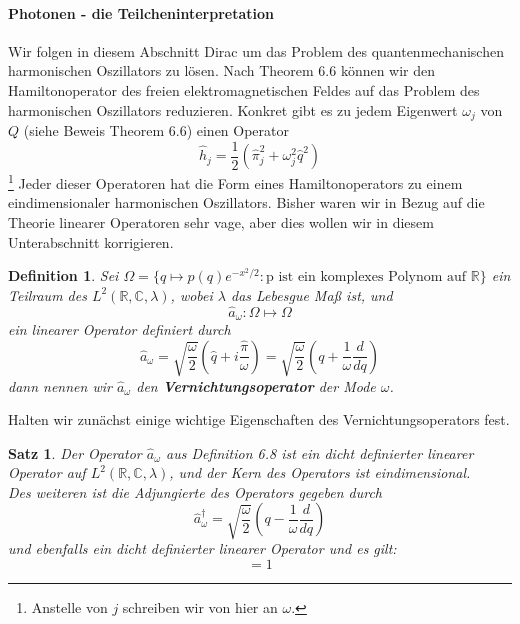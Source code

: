\documentclass[11pt,a4paper,leqno]{report}
\newtheorem{proposition}{Satz}[chapter]
\newtheorem{definition}[theorem]{Definition}
\numberwithin{equation}{chapter}
\begin{document}
\paragraph{Photonen - die Teilcheninterpretation}
Wir folgen in diesem Abschnitt Dirac um das Problem des quantenmechanischen harmonischen Oszillators zu l\"osen. Nach Theorem 6.6 k\"onnen wir den Hamiltonoperator des freien elektromagnetischen Feldes auf das Problem des harmonischen Oszillators reduzieren. Konkret gibt es zu jedem Eigenwert $\omega_j$ von $Q$ (siehe Beweis Theorem 6.6) einen Operator
\begin{equation*}
	\hat{h}_j = \frac{1}{2}(\hat{\pi}_j^2 + \omega_j^2 \hat{q}^2)
\end{equation*}\footnote{Anstelle von $j$ schreiben wir von hier an $\omega$.}
Jeder dieser Operatoren hat die Form eines Hamiltonoperators zu einem eindimensionaler harmonischen Oszillators. Bisher waren wir in Bezug auf die Theorie linearer Operatoren sehr vage, aber dies wollen wir in diesem Unterabschnitt korrigieren.
\begin{definition}
	Sei $\Omega=\{q\mapsto p(q)e^{-x^2 / 2}: \text{p ist ein komplexes Polynom auf $\mathbb{R}$}\}$ ein Teilraum des $L^2(\mathbb{R}, \mathbb{C},\lambda)$, wobei $\lambda$ das Lebesgue Ma\ss{} ist, und 
	\begin{equation}
		\hat{a}_\omega: \Omega \mapsto \Omega
	\end{equation}
ein linearer Operator definiert durch 
\begin{equation}
	\hat{a}_\omega = \sqrt{\frac{\omega}{2}}(\hat{q} + i \frac{\hat{\pi}}{\omega}) = \sqrt{\frac{\omega}{2}}(q +  \frac{1}{\omega}\frac{d}{dq})
\end{equation}
dann nennen wir $\hat{a}_\omega$ den \textbf{Vernichtungsoperator} der Mode $\omega$.
\end{definition}
\noindent
Halten wir zun\"achst einige wichtige Eigenschaften des 
Vernichtungsoperators fest.
\begin{proposition}
	Der Operator $\hat{a}_\omega$ aus Definition 6.8 ist ein dicht definierter linearer Operator auf $L^2(\mathbb{R}, \mathbb{C},\lambda)$, und der Kern des Operators ist eindimensional.\\
	Des weiteren ist die Adjungierte des Operators gegeben durch 
	\begin{equation}
		\hat{a}_\omega^\dagger = \sqrt{\frac{\omega}{2}}(q - \frac{1}{\omega}\frac{d}{dq})
	\end{equation}
	und ebenfalls ein dicht definierter linearer Operator und es gilt:
	\begin{equation}
		[\hat{a}_\omega, \hat{a}_\omega^\dagger] = 1
	\end{equation}
\end{proposition}
\end{document}

